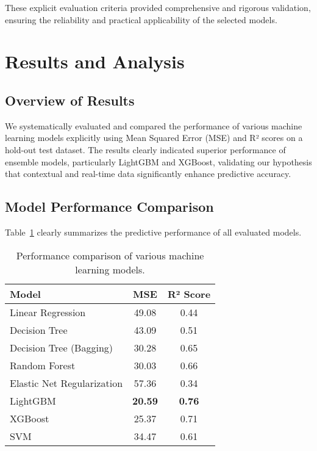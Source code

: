 \documentclass[10pt,twocolumn,letterpaper]{article}
\begin{document}
These explicit evaluation criteria provided comprehensive and rigorous validation, ensuring the reliability and practical applicability of the selected models.

\section{Results and Analysis}

\subsection{Overview of Results}
We systematically evaluated and compared the performance of various machine learning models explicitly using Mean Squared Error (MSE) and R² scores on a hold-out test dataset. The results clearly indicated superior performance of ensemble models, particularly LightGBM and XGBoost, validating our hypothesis that contextual and real-time data significantly enhance predictive accuracy.

\subsection{Model Performance Comparison}
Table~\ref{tab:model_metrics} clearly summarizes the predictive performance of all evaluated models.

\begin{table}[ht]
    \centering
    \begin{tabular}{|l|c|c|}
        \hline
        \textbf{Model} & \textbf{MSE} & \textbf{R² Score} \\ \hline
        Linear Regression              & 49.08     & 0.44      \\ \hline
        Decision Tree                  & 43.09     & 0.51      \\ \hline
        Decision Tree (Bagging)        & 30.28     & 0.65      \\ \hline
        Random Forest                  & 30.03     & 0.66      \\ \hline
        Elastic Net Regularization     & 57.36     & 0.34      \\ \hline
        LightGBM                       & \textbf{20.59} & \textbf{0.76} \\ \hline
        XGBoost                        & 25.37     & 0.71      \\ \hline
        SVM                            & 34.47     & 0.61      \\ \hline
    \end{tabular}
    \caption{Performance comparison of various machine learning models.}
    \label{tab:model_metrics}
\end{table}
\end{document}
